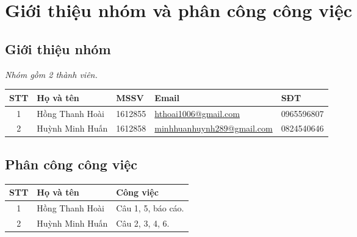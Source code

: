 \section{Giới thiệu nhóm và phân công công việc}
\subsection{Giới thiệu nhóm}
\textit{Nhóm gồm 2 thành viên.}   	
\begin{table*}[h]\centering
{}
\begin{tabular}{cllll}\toprule
\textbf{STT} & \textbf{Họ và tên} & \textbf{MSSV} & \textbf{Email} & \textbf{SĐT}\\\midrule
1 & Hồng Thanh Hoài & 1612855 & \href{mailto:hthoai1006@gmail.com}{hthoai1006@gmail.com} & 0965596807\\
2 & Huỳnh Minh Huấn & 1612858 & \href{mailto:minhhuanhuynh289@gmail.com}{minhhuanhuynh289@gmail.com} & 0824540646\\
\bottomrule
\end{tabular}
\end{table*}

\subsection{Phân công công việc}


\begin{table*}[h]\centering
{}
\begin{tabular}{cll}\toprule
\textbf{STT} & \textbf{Họ và tên} & \textbf{Công việc}\\\midrule
1 & Hồng Thanh Hoài & Câu 1, 5, báo cáo.\\
2 & Huỳnh Minh Huấn & Câu 2, 3, 4, 6.\\
\bottomrule
\end{tabular}
\end{table*}
\newpage